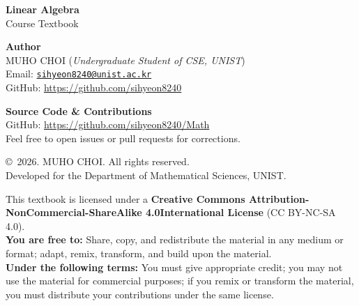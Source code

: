 \documentclass[11pt, a4paper, oneside]{book}
\begin{document}
\begin{flushleft}
    \vfill

    {\large \textbf{Linear Algebra}}
    \\[0.2cm]
    {\small Course Textbook} \\
    
    \vspace{2cm}
    
    \textbf{Author} \\
    MUHO CHOI (\emph{Undergraduate Student of CSE, UNIST}) \\
    Email: \href{mailto:sihyeon8240@unist.ac.kr}{\texttt{sihyeon8240@unist.ac.kr}} \\
    GitHub: \url{https://github.com/sihyeon8240} \\
    
    \vspace{1cm}
    
    \textbf{Source Code \& Contributions} \\
    GitHub: \url{https://github.com/sihyeon8240/Math} \\
    \footnotesize{Feel free to open issues or pull requests for corrections.}
    
    \vspace{1cm}
    
    \copyright\ 2026. MUHO CHOI. All rights reserved. \\
    \small{Developed for the Department of Mathematical Sciences, UNIST.} \\

    \vspace{0.4cm}
    
    \footnotesize{
        This textbook is licensed under a
        \textbf{Creative Commons Attribution-NonCommercial-ShareAlike 4.0International License} (CC BY-NC-SA 4.0). \\
        \vspace{0.1cm}
        \textbf{You are free to:} Share, copy, and redistribute the material in any medium or format;
        adapt, remix, transform, and build upon the material. \\
        \textbf{Under the following terms:} You must give appropriate credit;
        you may not use the material for commercial purposes;
        if you remix or transform the material, you must distribute your contributions under the same license.
    }
\end{flushleft}

\tableofcontents

\mainmatter

\backmatter
\end{document}
